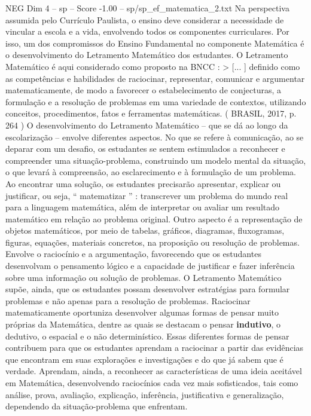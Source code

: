 \begin{textsample}{NEG Dim 4 – sp – Score -1.00 – sp/sp\_ef\_matematica\_2.txt}  \label{ex:f4_neg_039}
Na perspectiva assumida pelo Currículo Paulista, o ensino deve considerar a necessidade de vincular a escola e a vida, envolvendo todos os componentes curriculares.
Por isso, um dos compromissos do Ensino Fundamental no componente Matemática é o desenvolvimento do Letramento Matemático dos estudantes.
O Letramento Matemático é aqui considerado como proposto na BNCC : > [... ] definido como as competências e habilidades de raciocinar, representar, comunicar e argumentar matematicamente, de modo a favorecer o estabelecimento de conjecturas, a formulação e a resolução de problemas em uma variedade de contextos, utilizando conceitos, procedimentos, fatos e ferramentas matemáticas. ( BRASIL, 2017, p. 264 ) O desenvolvimento do Letramento Matemático – que se dá ao longo da escolarização – envolve diferentes aspectos.
No que se refere à comunicação, ao se deparar com um desafio, os estudantes se sentem estimulados a reconhecer e compreender uma situação-problema, construindo um modelo mental da situação, o que levará à compreensão, ao esclarecimento e à formulação de um problema.
Ao encontrar uma solução, os estudantes precisarão apresentar, explicar ou justificar, ou seja, “ matematizar ” : transcrever um problema do mundo real para a linguagem matemática, além de interpretar ou avaliar um resultado matemático em relação ao problema original.
Outro aspecto é a representação de objetos matemáticos, por meio de tabelas, gráficos, diagramas, fluxogramas, figuras, equações, materiais concretos, na proposição ou resolução de problemas.
Envolve o raciocínio e a argumentação, favorecendo que os estudantes desenvolvam o pensamento lógico e a capacidade de justificar e fazer inferência sobre uma informação ou solução de problemas.
O Letramento Matemático supõe, ainda, que os estudantes possam desenvolver estratégias para formular problemas e não apenas para a resolução de problemas.
Raciocinar matematicamente oportuniza desenvolver algumas formas de pensar muito próprias da Matemática, dentre as quais se destacam o pensar \textbf{indutivo}, o dedutivo, o espacial e o não determinístico.
Essas diferentes formas de pensar contribuem para que os estudantes aprendam a raciocinar a partir das evidências que encontram em suas explorações e investigações e do que já sabem que é verdade.
Aprendam, ainda, a reconhecer as características de uma ideia aceitável em Matemática, desenvolvendo raciocínios cada vez mais sofisticados, tais como análise, prova, avaliação, explicação, inferência, justificativa e generalização, dependendo da situação-problema que enfrentam.

\end{textsample}
